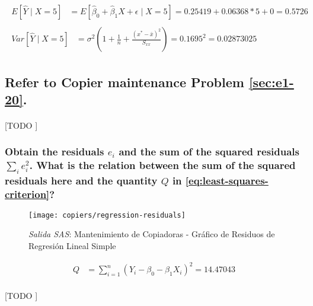 \documentclass{article}
\begin{document}
        \begin{align}
          \begin{split}
            E\left[\widehat{Y} \mid X = 5\right] &=
            E\left[\widehat{\beta}_0 +\widehat{\beta}_1X + \epsilon \mid X = 5\right]
            = 0.25419 + 0.06368 * 5 + 0 = 0.5726
          \end{split}\\
          \begin{split}
            Var\left[\widehat{Y} \mid X = 5\right] &=
            \sigma^2\left(1 + \frac{1}{n} + \frac{(x^* - \bar{x})^2}{S_{xx}}\right) =
            0.1695 ^ 2 =
            0.02873025
          \end{split}
        \end{align}

    \setcounter{subsection}{23}
    \subsection{Refer to \textbf{Copier maintenance} Problem \ref{sec:e1-20}.}

      \paragraph{}
      [TODO ]

      \subsubsection{Obtain the residuals $e_i$ and the sum of the squared residuals $\sum_i e_i^2$. What is the relation between the sum of the squared residuals here and the quantity $Q$ in \eqref{eq:least-squares-criterion}?}

        \begin{figure}[!h]
          \centering
          \texttt{[image: copiers/regression-residuals]}
          \caption{\emph{Salida SAS}: Mantenimiento de Copiadoras - Gráfico de Residuos de Regresión Lineal Simple}
          \label{img:copiers-regression-residuals}
        \end{figure}

        \begin{align}
        \label{eq:least-squares-criterion}
          Q &= \sum\limits_{i=1}^n(Y_i - \beta_0 - \beta_1X_i)^2 = 14.47043
        \end{align}


        \paragraph{}
        [TODO ]
\end{document}
